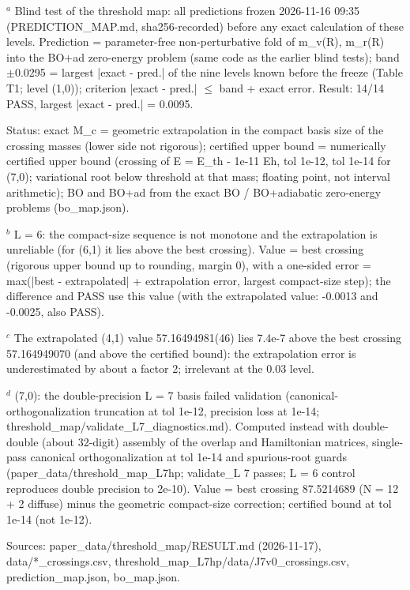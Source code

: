 \begin{table}[t]
\par\footnotesize $^a$ Blind test of the threshold map: all predictions frozen 2026-11-16 09:35 (PREDICTION\_MAP.md, sha256-recorded) before any exact calculation of these levels. Prediction = parameter-free non-perturbative fold of m\_v(R), m\_r(R) into the BO+ad zero-energy problem (same code as the earlier blind tests); band $\pm$0.0295 = largest |exact - pred.| of the nine levels known before the freeze (Table T1; level (1,0)); criterion |exact - pred.| $\le$ band + exact error. Result: 14/14 PASS, largest |exact - pred.| = 0.0095.
\par\footnotesize Status: exact M\_c = geometric extrapolation in the compact basis size of the crossing masses (lower side not rigorous); certified upper bound = numerically certified upper bound (crossing of E = E\_th - 1e-11 Eh, tol 1e-12, tol 1e-14 for (7,0); variational root below threshold at that mass; floating point, not interval arithmetic); BO and BO+ad from the exact BO / BO+adiabatic zero-energy problems (bo\_map.json).
\par\footnotesize $^b$ L = 6: the compact-size sequence is not monotone and the extrapolation is unreliable (for (6,1) it lies above the best crossing). Value = best crossing (rigorous upper bound up to rounding, margin 0), with a one-sided error = max(|best - extrapolated| + extrapolation error, largest compact-size step); the difference and PASS use this value (with the extrapolated value: -0.0013 and -0.0025, also PASS).
\par\footnotesize $^c$ The extrapolated (4,1) value 57.16494981(46) lies 7.4e-7 above the best crossing 57.164949070 (and above the certified bound): the extrapolation error is underestimated by about a factor 2; irrelevant at the 0.03 level.
\par\footnotesize $^d$ (7,0): the double-precision L = 7 basis failed validation (canonical-orthogonalization truncation at tol 1e-12, precision loss at 1e-14; threshold\_map/validate\_L7\_diagnostics.md). Computed instead with double-double (about 32-digit) assembly of the overlap and Hamiltonian matrices, single-pass canonical orthogonalization at tol 1e-14 and spurious-root guards (paper\_data/threshold\_map\_L7hp; validate\_L 7 passes; L = 6 control reproduces double precision to 2e-10). Value = best crossing 87.5214689 (N = 12 + 2 diffuse) minus the geometric compact-size correction; certified bound at tol 1e-14 (not 1e-12).
\par\footnotesize Sources: paper\_data/threshold\_map/RESULT.md (2026-11-17), data/*\_crossings.csv, threshold\_map\_L7hp/data/J7v0\_crossings.csv, prediction\_map.json, bo\_map.json.
\end{table}

